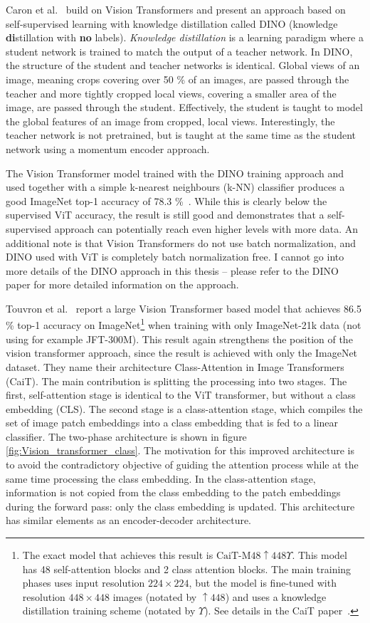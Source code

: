 \documentclass[english,twoside,openright]{HYgraduMLDS}
\begin{document}
Caron et al.~\cite{DINO} build on Vision Transformers and present an approach based on self-supervised learning with knowledge distillation called DINO (knowledge \textbf{di}stillation with \textbf{no} labels). \textit{Knowledge distillation} is a learning paradigm where a student network is trained to match the output of a teacher network. In DINO, the structure of the student and teacher networks is identical. Global views of an image, meaning crops covering over 50 \% of an images, are passed through the teacher and more tightly cropped local views, covering a smaller area of the image, are passed through the student. Effectively, the student is taught to model the global features of an image from cropped, local views. Interestingly, the teacher network is not pretrained, but is taught at the same time as the student network using a momentum encoder approach. 

The Vision Transformer model trained with the DINO training approach and used together with a simple k-nearest neighbours (k-NN) classifier produces a good ImageNet top-1 accuracy of 78.3 \%~\cite{DINO}. While this is clearly below the supervised ViT accuracy, the result is still good and demonstrates that a self-supervised approach can potentially reach even higher levels with more data. An additional note is that Vision Transformers do not use batch normalization, and DINO used with ViT is completely batch normalization free. I cannot go into more details of the DINO approach in this thesis -- please refer to the DINO paper for more detailed information on the approach.

Touvron et al.~\cite{DeeperImageTransformers} report a large Vision Transformer based model that achieves 86.5 \% top-1 accuracy on ImageNet\footnote{The exact model that achieves this result is $\text{CaiT-M48}\uparrow448\Upsilon$. This model has 48 self-attention blocks and 2 class attention blocks. The main training phases uses input resolution $224 \times 224$, but the model is fine-tuned with resolution $448 \times 448$ images (notated by $\uparrow448$) and uses a knowledge distillation training scheme (notated by $\Upsilon$). See details in the CaiT paper~\cite{DeeperImageTransformers}.} when training with only ImageNet-21k data (not using for example JFT-300M). This result again strengthens the position of the vision transformer approach, since the result is achieved with only the ImageNet dataset. They name their architecture Class-Attention in Image Transformers (CaiT). The main contribution is splitting the processing into two stages. The first, self-attention stage is identical to the ViT transformer, but without a class embedding (CLS). The second stage is a class-attention stage, which compiles the set of image patch embeddings into a class embedding that is fed to a linear classifier. The two-phase architecture is shown in figure \ref{fig:Vision_transformer_class}. The motivation for this improved architecture is to avoid the contradictory objective of guiding the attention process while at the same time processing the class embedding. In the class-attention stage, information is not copied from the class embedding to the patch embeddings during the forward pass: only the class embedding is updated. This architecture has similar elements as an encoder-decoder architecture.
\end{document}
